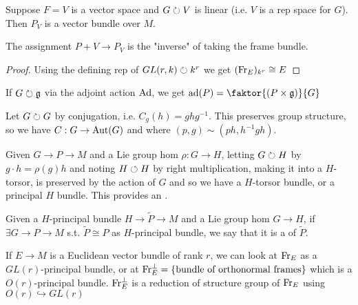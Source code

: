 \documentclass{article}
\begin{document}
\begin{example}
Suppose $F=V$ is a vector space and $G \circlearrowright V$ is linear (i.e. $V$ is a rep space for $G$). Then $P_V$ is a vector bundle over $M$. 
\end{example}

\begin{prop}
The assignment $P+V \to P_V$ is the "inverse" of taking the frame bundle.  
\end{prop}
\begin{proof}
Using the defining rep of $GL(r,k) \circlearrowright k^r$ we get $(\operatorname{Fr}_E)_{k^r} \cong E$
\end{proof}

\begin{example}
If $G \circlearrowright \mathfrak{g}$ via the adjoint action $\operatorname{Ad}$, we get $\ad(P) = \faktor{(P \times \mf{g})}{G}$
\end{example}

\begin{example}
Let $G \circlearrowright G$ by conjugation, i.e. $C_g(h) = ghg^{-1}$. This preserves group structure, so we have $C : G \to \operatorname{Aut}(G)$ and 
where $(p,g) \sim (ph,h^{-1}gh)$.
\end{example}

\begin{definition}
	Given $G \to P \to M$ and a Lie group hom $\rho : G \to H$, letting $G \circlearrowright H$ by $g \cdot h = \rho(g)h$ and noting $H \circlearrowleft H$ by right multiplication, making it into a $H$-torsor, is preserved by the action of $G$ and so we have  
	a $H$-torsor bundle, or a principal $H$ bundle. This provides an .
\end{definition}

\begin{definition}
Given a $H$-principal bundle $H \to \tilde{P} \to M$ and a Lie group hom $G \to H$, if $\exists G \to P \to M$ s.t.  $\tilde{P} \cong P$ as $H$-principal bundle, we say that it is a  of $\tilde{P}$.
\end{definition}

\begin{example}
If $E \to M$ is a Euclidean vector bundle of rank $r$, we can look at $\operatorname{Fr}_E$ as a $GL(r)$-principal bundle, or at $\operatorname{Fr}_E^\perp= \left\{ \text{bundle of orthonormal frames} \right\}$ which is a $O(r)$-principal bundle. $\operatorname{Fr}_E^\perp$ is a reduction of structure group of $\operatorname{Fr}_E$ using $O(r) \hookrightarrow GL(r)$
\end{example}
\end{document}
